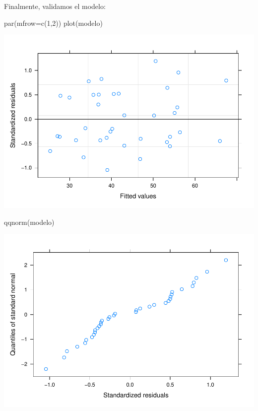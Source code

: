 \documentclass[
]{book}
\newenvironment{Shaded}{\begin{snugshade}}{\end{snugshade}}
\newcommand{\AttributeTok}[1]{\textcolor[rgb]{0.77,0.63,0.00}{#1}}
\newcommand{\DecValTok}[1]{\textcolor[rgb]{0.00,0.00,0.81}{#1}}
\newcommand{\FunctionTok}[1]{\textcolor[rgb]{0.00,0.00,0.00}{#1}}
\newcommand{\NormalTok}[1]{#1}
\begin{document}
Finalmente, validamos el modelo:

\begin{Shaded}
\begin{Highlighting}[]
\FunctionTok{par}\NormalTok{(}\AttributeTok{mfrow=}\FunctionTok{c}\NormalTok{(}\DecValTok{1}\NormalTok{,}\DecValTok{2}\NormalTok{))}
\FunctionTok{plot}\NormalTok{(modelo)}
\end{Highlighting}
\end{Shaded}

\includegraphics{fig_out/unnamed-chunk-90-1.pdf}

\begin{Shaded}
\begin{Highlighting}[]
\FunctionTok{qqnorm}\NormalTok{(modelo)}
\end{Highlighting}
\end{Shaded}

\includegraphics{fig_out/unnamed-chunk-90-2.pdf}
\end{document}
